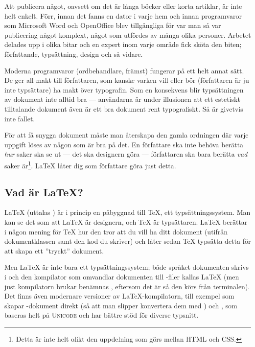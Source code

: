 \documentclass[lang=sv,ptsize=10pt,font=none,nomath,titles=bf,../../a4.tex]{subfiles}
\begin{document}
Att publicera något, oavsett om det är långa böcker eller korta artiklar,
är inte helt enkelt. Förr, innan det fanns en dator i varje hem och innan
programvaror som Microsoft Word och Open\-Office blev tillgängliga för var
man så var publicering något komplext, något som utfördes av många olika
personer. Arbetet delades upp i olika bitar och en expert inom varje
område fick sköta den biten; författande, typsättning, design och så
vidare.

Moderna programvaror (ordbehandlare, främst) fungerar på ett helt annat
sätt. De ger all makt till författaren, som kanske varken vill eller bör
(författaren är ju inte typsättare) ha makt över typografin. Som en konsekvens
blir typsättningen av dokument inte alltid bra — användarna är under
illusionen att ett estetiskt tilltalande dokument även är ett bra dokument
rent typografiskt. Så är givetvis inte fallet.

För att få snygga dokument måste man återskapa den gamla ordningen där
varje uppgift löses av någon som är bra på det. En författare ska inte
behöva berätta \emph{hur} saker ska se ut — det ska designern göra —
författaren ska bara berätta \emph{vad} saker är\footnote{Detta är inte
helt olikt den uppdelning som görs mellan HTML och CSS.}. \LaTeX{} låter
dig som författare göra just detta.

{}
\subsection*{Vad är \LaTeX{}?}
\LaTeX{} (uttalas ) är i princip en
påbyggnad till \TeX{}, ett typsättningssystem. Man kan se det som att
\LaTeX{} är designern, och \TeX{} är typsättaren. \LaTeX{} berättar i
någon mening för \TeX{} hur den tror att du vill ha ditt dokument (utifrån
dokumentklassen samt den kod du skriver) och låter sedan \TeX{} typsätta
detta för att skapa ett ”tryckt” dokument.

Men \LaTeX{} är inte bara ett typsättningssystem; både språket dokumenten
skrivs i och den kompilator som omvandlar dokumenten till \DVI-filer
kallas \LaTeX{} (men just kompilatorn brukar benämnas ,
eftersom det är så den körs från terminalen). Det finns även modernare
versioner av \LaTeX{}-kompilatorn, till exempel \pdfLaTeX{} som skapar
\PDF-dokument
 direkt (så att man slipper konvertera dem med ) och
\XeTeX{}, som baseras helt på \textsc{Unicode} och har bättre stöd för
diverse typsnitt.
\end{document}
